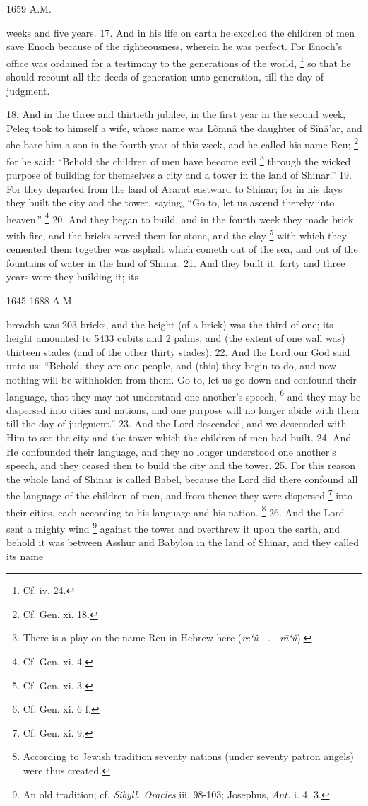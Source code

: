 1659 A.M.

weeks and five years. 17. And in his life on earth he excelled the children of men save Enoch because of the righteousness, wherein he was perfect. For Enoch's office was ordained for a testimony to the generations of the world, \footnote{Cf. iv. 24.} so that he should recount all the deeds of generation unto generation, till the day of judgment.


18. And in the three and thirtieth jubilee, in the first year in the second week, Peleg took to himself a wife, whose name was Lômnâ the daughter of Sînâ’ar, and she bare him a son in the fourth year of this week, and he called his name Reu; \footnote{Cf. Gen. xi. 18.} for he said: ``Behold the children of men have become evil \footnote{There is a play on the name Reu in Hebrew here (\emph{re‘û} . . . \emph{rā‘û}).} through the wicked purpose of building for themselves a city and a tower in the land of Shinar.'' 19. For they departed from the land of Ararat eastward to Shinar; for in his days they built the city and the tower, saying, ``Go to, let us ascend thereby into heaven.'' \footnote{Cf. Gen. xi. 4.} 20. And they began to build, and in the fourth week they made brick with fire, and the bricks served them for stone, and the clay \footnote{Cf. Gen. xi. 3.} with which they cemented them together was asphalt which cometh out of the sea, and out of the fountains of water in the land of Shinar. 21. And they built it: forty and three years were they building it; its

1645-1688 A.M.

breadth was 203 bricks, and the height (of a brick) was the third of one; its height amounted to 5433 cubits and 2 palms, and (the extent of one wall was) thirteen stades (and of the other thirty stades). 22. And the Lord our God said unto us: ``Behold, they are one people, and (this) they begin to do, and now nothing will be withholden from them. Go to, let us go down and confound their language, that they may not understand one another's speech, \footnote{Cf. Gen. xi. 6 f.} and they may be dispersed into cities and nations, and one purpose will no longer abide with them till the day of judgment.'' 23. And the Lord descended, and we descended with Him to see the city and the tower which the children of men had built. 24. And He confounded their language, and they no longer understood one another's speech, and they ceased then to build the city and the tower. 25. For this reason the whole land of Shinar is called Babel, because the Lord did there confound all the language of the children of men, and from thence they were dispersed \footnote{Cf. Gen. xi. 9.} into their cities, each according to his language and his nation. \footnote{According to Jewish tradition seventy nations (under seventy patron angels) were thus created.} 26. And the Lord sent a mighty wind \footnote{An old tradition; cf. \emph{Sibyll. Oracles} iii. 98-103; Josephus, \emph{Ant.} i. 4, 3.} against the tower and overthrew it upon the earth, and behold it was between Asshur and Babylon in the land of Shinar, and they called its name

